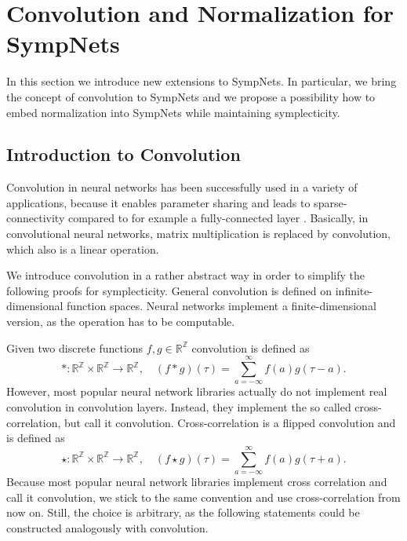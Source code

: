 \documentclass[twoside,a4paper]{article}
\begin{document}
\section{Convolution and Normalization for SympNets}\label{sec_conv_and_norm_for_sympnets}

In this section we introduce new extensions to SympNets. In particular, we bring the concept
of convolution to SympNets and we propose a possibility how to embed normalization into SympNets while
maintaining symplecticity.

\subsection{Introduction to Convolution}

Convolution in neural networks has been successfully used in a variety of 
applications, because it enables parameter sharing and leads to 
sparse-connectivity compared to for example a fully-connected layer \cite{Goodfellow2016}.
Basically, in convolutional neural networks, matrix multiplication is 
replaced by convolution, which also is a linear operation.

We introduce convolution in a rather abstract way in order to simplify the following proofs
for symplecticity.
General convolution is defined on infinite-dimensional function spaces.
Neural networks implement a finite-dimensional version, as the operation has to be
computable.

Given two discrete functions $f,g \in \mathbb{R}^\mathbb{Z}$ convolution is defined as 
\begin{equation*}
	*: \mathbb{R}^{\mathbb{Z}} \times \mathbb{R}^{\mathbb{Z}} \to \mathbb{R}^{\mathbb{Z}},
	\quad (f*g)(\tau) = \sum^{\infty}_{a=-\infty} f(a) g(\tau - a)
	.
\end{equation*}
However, most popular neural network libraries actually do not implement real convolution
in convolution layers. Instead, they implement the so called cross-correlation, but call it convolution. 
Cross-correlation is a flipped convolution and is defined as
\begin{equation*}
	\star: \mathbb{R}^{\mathbb{Z}} \times \mathbb{R}^{\mathbb{Z}} \to \mathbb{R}^{\mathbb{Z}},
	\quad (f \star g)(\tau) = \sum^{\infty}_{a=-\infty} f(a) g(\tau + a)
	.
\end{equation*}
Because most popular neural network libraries implement cross correlation and call it convolution,
we stick to the same convention and use cross-correlation from now on.
Still, the choice is arbitrary, as the following statements could be constructed analogously with convolution.
\end{document}
